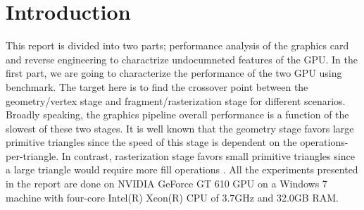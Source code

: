 \section{Introduction}
This report is divided into two parts; performance analysis of the graphics card and reverse engineering to charactrize undocumneted features of the GPU. In the first part, we are going to characterize the performance of the two GPU using \protect{\wes} benchmark. The target here is to find the crossover point between the geometry/vertex stage and fragment/rasterization stage for different scenarios. Broadly speaking, the graphics pipeline overall performance is a function of the slowest of these two stages. It is well known that the geometry stage favors large primitive triangles since the speed of this stage is dependent on the operations-per-triangle. In contrast, rasterization stage favors small primitive triangles since a large triangle would require more fill operations \cite{Bethel_2010}. All the experiments presented in the report are done on NVIDIA GeForce GT 610 GPU on a Windows 7 machine with four-core Intel(R) Xeon(R) CPU of 3.7GHz and 32.0GB RAM.
